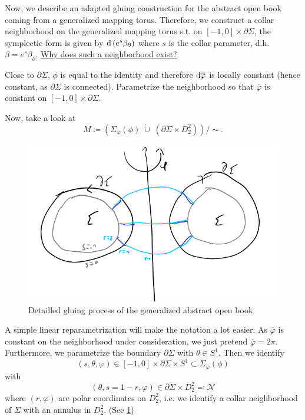 Now, we describe an adapted gluing construction for the abstract open book coming from a generalized mapping torus.
Therefore, we construct a collar neighborhood on the generalized mapping torus s.t. on $[-1,0] \times \partial \Sigma$, the symplectic form is given by $\mathrm{d} \left(e^s\beta_\partial\right)$ where $s$ is the collar parameter, d.h. $\beta = e^s\beta_\partial$.
\underline{Why does such a neighborhood exist?}

Close to $\partial \Sigma$, $\phi$ is equal to the identity and therefore $\mathrm{d} \overline{\varphi}$ is locally constant (hence constant, as $\partial \Sigma$ is connected).
Parametrize the neighborhood so that $\overline{\varphi}$ is constant on $[-1,0]\times \partial \Sigma$.

Now, take a look at
\[
    M \coloneqq \left(\Sigma_{\overline{\varphi}}(\phi)\; \dot\cup\; \left(\partial \Sigma \times D_2^2\right)\right)/\sim.
\]
\begin{figure}
    \includegraphics[width=\textwidth]{images/abstract_open_book_gluing.png}
    \caption[Gluing an abstract open book]{Detailled gluing process of the generalized abstract open book}
    \label{fig:abstract_open_book_gluing}
\end{figure}
A simple linear reparametrization will make the notation a lot easier: As $\overline{\varphi}$ is constant on the neighborhood under consideration, we just pretend $\overline{\varphi} = 2\pi$.
Furthermore, we parametrize the boundary $\partial \Sigma$ with $\theta \in S^1$.
Then we identify 
\[
    (s, \theta, \varphi) \in [-1,0] \times \partial \Sigma \times S^1 \subset \Sigma_{\overline{\varphi}}(\phi)
\]
with
\[
    (\theta, s = 1-r, \varphi) \in \partial \Sigma \times D_2^2 \eqqcolon \mathcal{N}
\]
where $(r, \varphi)$ are polar coordinates on $D_2^2$, i.e. we identify a collar neighborhood of $\Sigma$ with an annulus in $D_2^2$.
(See \cref{fig:abstract_open_book_gluing})


